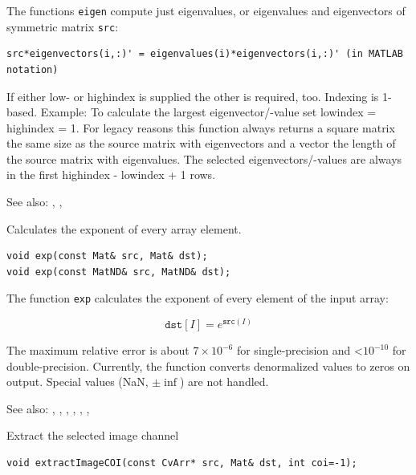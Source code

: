 The functions \texttt{eigen} compute just eigenvalues, or eigenvalues and eigenvectors of symmetric matrix \texttt{src}:

\begin{lstlisting}
src*eigenvectors(i,:)' = eigenvalues(i)*eigenvectors(i,:)' (in MATLAB notation)
\end{lstlisting}

If either low- or highindex is supplied the other is required, too.
Indexing is 1-based. Example: To calculate the largest eigenvector/-value set
lowindex = highindex = 1.
For legacy reasons this function always returns a square matrix the same size
as the source matrix with eigenvectors and a vector the length of the source
matrix with eigenvalues. The selected eigenvectors/-values are always in the
first highindex - lowindex + 1 rows.

See also: , , 

\label{exp}
Calculates the exponent of every array element.

\begin{lstlisting}
void exp(const Mat& src, Mat& dst);
void exp(const MatND& src, MatND& dst);
\end{lstlisting}
\begin{description}
\end{description}

The function \texttt{exp} calculates the exponent of every element of the input array:

\[
\texttt{dst} [I] = e^{\texttt{src}(I)}
\]

The maximum relative error is about $7 \times 10^{-6}$ for single-precision and <$10^{-10}$ for double-precision. Currently, the function converts denormalized values to zeros on output. Special values (NaN, $\pm \inf$) are not handled.

See also: , , , , , , 

\label{extractImageCOI}

Extract the selected image channel

\begin{lstlisting}
void extractImageCOI(const CvArr* src, Mat& dst, int coi=-1);
\end{lstlisting}
\begin{description}
\end{description}

